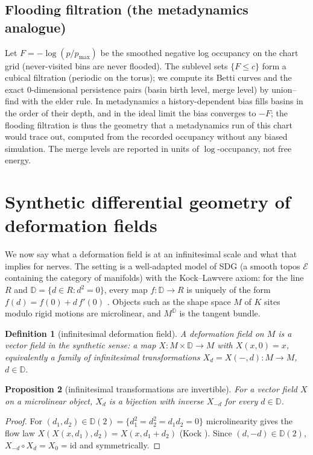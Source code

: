 \documentclass[11pt]{article}
\newtheorem{definition}{Definition}[section]
\newtheorem{proposition}[definition]{Proposition}
\newcommand{\D}{\mathbb{D}}
\begin{document}
\subsection{Flooding filtration (the metadynamics analogue)}\label{sec:flood}
Let $F=-\log(p/p_{\max})$ be the smoothed negative log occupancy on the chart grid (never-visited bins are never flooded). The sublevel sets $\{F\le c\}$ form a cubical filtration (periodic on the torus); we compute its Betti curves and the exact 0-dimensional persistence pairs (basin birth level, merge level) by union--find with the elder rule. In metadynamics a history-dependent bias fills basins in the order of their depth, and in the ideal limit the bias converges to $-F$; the flooding filtration is thus the geometry that a metadynamics run of this chart would trace out, computed from the recorded occupancy without any biased simulation. The merge levels are reported in units of $\log$-occupancy, not free energy.

\section{Synthetic differential geometry of deformation fields}\label{sec:sdg}
We now say what a deformation field is at an infinitesimal scale and what that implies for nerves. The setting is a well-adapted model of SDG (a smooth topos $\mathcal{E}$ containing the category of manifolds) with the Kock--Lawvere axiom: for the line $R$ and $\D=\{d\in R: d^2=0\}$, every map $f:\D\to R$ is uniquely of the form $f(d)=f(0)+d\,f'(0)$ \cite{kock2006,lavendhomme}. Objects such as the shape space $M$ of $K$ sites modulo rigid motions are microlinear, and $M^{\D}$ is the tangent bundle.

\begin{definition}[infinitesimal deformation field]
A \emph{deformation field} on $M$ is a vector field in the synthetic sense: a map $X:M\times\D\to M$ with $X(x,0)=x$, equivalently a family of \emph{infinitesimal transformations} $X_d=X(-,d):M\to M$, $d\in\D$.
\end{definition}

\begin{proposition}[infinitesimal transformations are invertible]\label{prop:inv}
For a vector field $X$ on a microlinear object, $X_d$ is a bijection with inverse $X_{-d}$ for every $d\in\D$.
\end{proposition}
\begin{proof}
For $(d_1,d_2)\in\D(2)=\{d_1^2=d_2^2=d_1d_2=0\}$ microlinearity gives the flow law $X(X(x,d_1),d_2)=X(x,d_1+d_2)$ (Kock \cite[I.8]{kock2006}). Since $(d,-d)\in\D(2)$, $X_{-d}\circ X_d=X_0=\mathrm{id}$ and symmetrically.
\end{proof}
\end{document}

